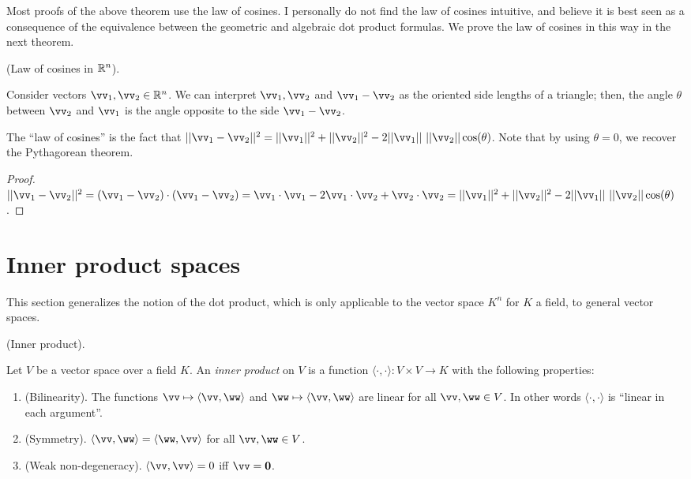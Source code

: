 Most proofs of the above theorem use the law of cosines. I personally do not find the law of cosines intuitive, and believe it is best seen as a consequence of the equivalence between the geometric and algebraic dot product formulas. We prove the law of cosines in this way in the next theorem.

\begin{theorem}
\label{ch::lin_alg::thm::law_of_cosines}
    (Law of cosines in $\mathbb{R}^n$). 
    
    Consider vectors $\vv_1, \vv_2 \in \R^n$. We can interpret $\vv_1, \vv_2$ and $\vv_1 - \vv_2$ as the oriented side lengths of a triangle; then, the angle $\theta$ between $\vv_2$ and $\vv_1$ is the angle opposite to the side $\vv_1 - \vv_2$.

    The ``law of cosines'' is the fact that $||\vv_1 - \vv_2||^2 = ||\vv_1||^2 + ||\vv_2||^2 - 2 ||\vv_1|| \spc ||\vv_2|| \cos(\theta)$. Note that by using $\theta = 0$, we recover the Pythagorean theorem.
\end{theorem}

\begin{proof}
   $||\vv_1 - \vv_2||^2 = (\vv_1 - \vv_2) \cdot (\vv_1 - \vv_2) = \vv_1 \cdot \vv_1 - 2 \vv_1 \cdot \vv_2 + \vv_2 \cdot \vv_2 = ||\vv_1||^2 + ||\vv_2||^2 - 2 ||\vv_1|| \spc ||\vv_2|| \cos(\theta)$.
\end{proof}

\newpage

\section*{Inner product spaces}

This section generalizes the notion of the dot product, which is only applicable to the vector space $K^n$ for $K$ a field, to general vector spaces.

\begin{defn}
    \label{ch::lin_alg::defn::inner_product}
    (Inner product).
    
    Let $V$ be a vector space over a field $K$. An \textit{inner product} on $V$ is a function $\langle \cdot, \cdot \rangle:V \times V \rightarrow K$ with the following properties:

    \begin{enumerate}
        \item (Bilinearity). The functions $\vv \mapsto \langle \vv, \ww \rangle$ and $\ww \mapsto \langle \vv, \ww \rangle$ are linear for all $\vv, \ww \in V$. In other words $\langle \cdot, \cdot \rangle$ is ``linear in each argument''.
        \item (Symmetry). $\langle \vv, \ww \rangle = \langle \ww, \vv \rangle$ for all $\vv, \ww \in V$.
        \item (Weak non-degeneracy). $\langle \vv, \vv \rangle = 0$ iff $\vv = \mathbf{0}$.
    \end{enumerate}
\end{defn}

